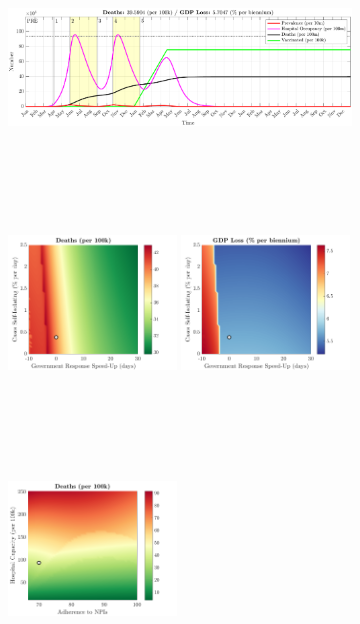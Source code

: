 \documentclass[paper=a4, fontsize=11pt]{scrartcl}
\numberwithin{figure}{section}
\numberwithin{table}{section}
\begin{document}
\begin{figure}[H]
\centering
    \begin{subfigure}[b]{\textwidth}
     	\includegraphics[width=\textwidth,height=5.5cm]{Counterfactuals/US_sars}
    \end{subfigure}
    \begin{subfigure}[b]{\textwidth}
      	\includegraphics[width=0.49\textwidth,height=6cm]{US/SARS/ero_d}
	\hspace{0.05cm}
    	\includegraphics[width=0.49\textwidth,height=6cm]{US/SARS/ero_g}
    \end{subfigure}
    \begin{subfigure}[b]{\textwidth}
      	\includegraphics[width=0.49\textwidth,height=6cm]{US/SARS/npl_d}

\end{subfigure}
\end{figure}
\end{document}
